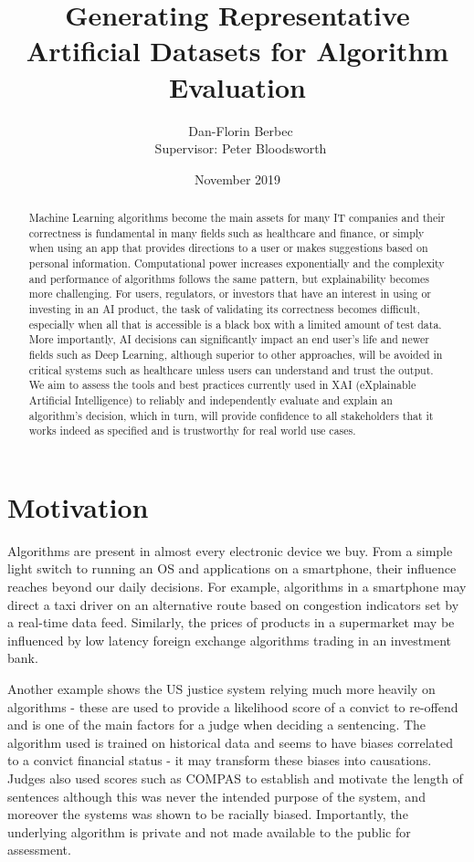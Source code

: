 \documentclass[proposal]{softeng}
\title{Generating Representative Artificial Datasets for Algorithm Evaluation}
\author{\ Dan-Florin Berbec \\ \ Supervisor: Peter Bloodsworth}
\date{November 2019}
\begin{document}
\maketitle

\newpage
\clearpage\mbox{}\clearpage

\begin{abstract}
Machine Learning algorithms become the main assets for many IT companies and their correctness is fundamental in many fields such as healthcare and finance, or simply when using an app that provides directions to a user or makes suggestions based on personal information. Computational power increases exponentially and the complexity and performance of algorithms follows the same pattern, but explainability becomes more challenging. For users, regulators, or investors that have an interest in using or investing in an AI product, the task of validating its correctness becomes difficult, especially when all that is accessible is a black box with a limited amount of test data. More importantly, AI decisions can significantly impact an end user's life and newer fields such as Deep Learning, although superior to other approaches, will be avoided in critical systems such as healthcare unless users can understand and trust the output. We aim to assess the tools and best practices currently used in XAI (eXplainable Artificial Intelligence) to reliably and independently evaluate and explain an algorithm's decision, which in turn, will provide confidence to all stakeholders that it works indeed as specified and is trustworthy for real world use cases.\end{abstract}
\setcounter{secnumdepth}{4}
 \setcounter{tocdepth}{4}
\tableofcontents
\newpage

\section{Motivation}
Algorithms are present in almost every electronic device we buy. From a simple light switch to running an OS and applications on a smartphone, their influence reaches beyond our daily decisions. For example, algorithms in a smartphone may direct a taxi driver on an alternative route based on congestion indicators set by a real-time data feed. Similarly, the prices of products in a supermarket may be influenced by low latency foreign exchange algorithms trading in an investment bank.

Another example shows the US justice system relying much more heavily on algorithms - these are used to provide a likelihood score of a convict to re-offend and is one of the main factors for a judge when deciding a sentencing\cite{jail}. The algorithm used is trained on historical data and seems to have biases correlated to a convict financial status - it may transform these biases into causations. Judges also used scores such as COMPAS to establish and motivate the length of sentences although this was never the intended purpose of the system, and moreover the systems was shown to be racially biased\cite{machine-bias}. Importantly, the underlying algorithm is private and not made available to the public for assessment.
\end{document}
